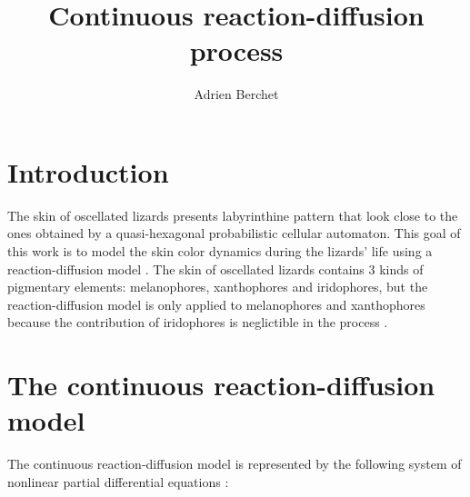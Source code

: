 \documentclass[a4paper]{article}
\begin{document}
\title{Continuous reaction-diffusion process}
\author{Adrien Berchet}

\maketitle

\section*{Introduction}

The skin of oscellated lizards presents labyrinthine pattern that look close to the ones obtained by a quasi-hexagonal probabilistic cellular automaton. This goal of this work is to model the skin color dynamics during the lizards' life using a reaction-diffusion model \citep{Manukyan2017}. The skin of oscellated lizards contains 3 kinds of pigmentary elements: melanophores, xanthophores and iridophores, but the reaction-diffusion model is only applied to melanophores and xanthophores because the contribution of iridophores is neglictible in the process \citep{Nakamasu8429}.

\section{The continuous reaction-diffusion model}

The continuous reaction-diffusion model is represented by the following system of nonlinear partial differential equations \citep{Nakamasu8429}:
\end{document}
